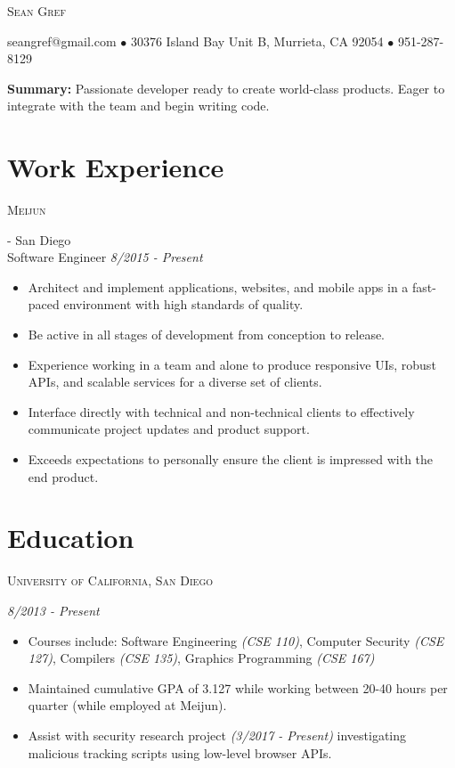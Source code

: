 \documentclass[letterpaper]{article} %
\begin{document}
\pagestyle{empty}


\par{\centering
		{\Huge\textsc{Sean Gref}
	}\bigskip\par}

\begin{center}
seangref@gmail.com $\bullet$ 30376 Island Bay Unit B, Murrieta, CA 92054 $\bullet$ 951-287-8129
\end{center}


\textbf{Summary: } Passionate developer ready to create world-class products. Eager to integrate with the team and begin writing code. 

\section{Work Experience}
\vspace{0.5em}

\noindent\begin{large}\textsc{Meijun}\end{large} - San Diego\\
\indent Software Engineer \textit{8/2015 - Present}
\begin{itemize}
\item Architect and implement applications, websites, and mobile apps in a fast-paced environment with high standards of quality.
\item Be active in all stages of development from conception to release.
\item Experience working in a team and alone to produce responsive UIs, robust APIs, and scalable services for a diverse set of clients. 
\item Interface directly with technical and non-technical clients to effectively communicate project updates and product support.
\item Exceeds expectations to personally ensure the client is impressed with the end product.
\end{itemize}

\section{Education}
\vspace{0.5em}
\noindent\begin{large}\textsc{University of California, San Diego}\end{large} \textit{8/2013 - Present}
\begin{itemize}
\item Courses include: Software Engineering \textit{(CSE 110)}, Computer Security \textit{(CSE 127)}, Compilers \textit{(CSE 135)}, Graphics Programming \textit{(CSE 167)}
\item Maintained cumulative GPA of 3.127 while working between 20-40 hours per quarter (while employed at Meijun).
\item Assist with security research project \textit{(3/2017 - Present)} investigating malicious tracking scripts using low-level browser APIs.
\end{itemize}
\end{document}
